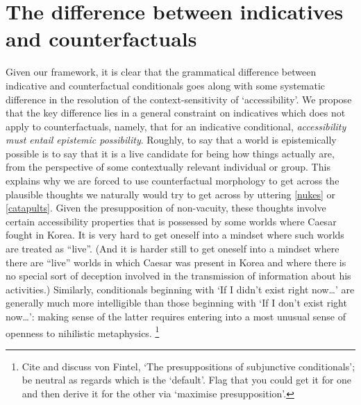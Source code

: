 \documentclass[If.tex]{subfiles}
\begin{document}
\section{The difference between indicatives and counterfactuals} \label{sect:indcf}
Given our framework, it is clear that the grammatical difference between indicative and counterfactual conditionals goes along with some systematic difference in the resolution of the context-sensitivity of ‘accessibility’. We propose that the key difference lies in a general constraint on indicatives which does not apply to counterfactuals, namely, that for an indicative conditional, \emph{accessibility must entail epistemic possibility}. Roughly, to say that a world is epistemically possible is to say that it is a live candidate for being how things actually are, from the perspective of some contextually relevant individual or group. This explains why we are forced to use counterfactual morphology to get across the plausible thoughts we naturally would try to get across by uttering \ref{nukes} or \ref{catapults}. Given the presupposition of non-vacuity, these thoughts involve certain accessibility properties that is possessed by some worlds where Caesar fought in Korea.  It is very hard to get oneself into a mindset where such worlds are treated as “live”. (And it is harder still to get oneself into a mindset where there are “live” worlds in which Caesar was present in Korea and where there is no special sort of deception involved in the transmission of information about his activities.) Similarly, conditionals beginning with ‘If I didn't exist right now\ldots{}’ are generally much more intelligible than those beginning with ‘If I don't exist right now\ldots{}’: making sense of the latter requires entering into a most unusual sense of openness to nihilistic metaphysics.%
\footnote{Cite and discuss von Fintel, ‘The presuppositions of subjunctive conditionals’; be neutral as regards which is the ‘default’. Flag that you could get it for one and then derive it for the other via ‘maximise presupposition’.}
\end{document}

